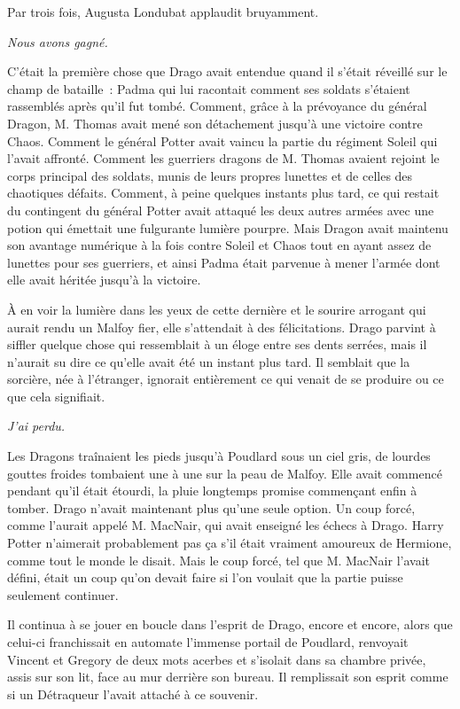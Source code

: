 Par trois fois, Augusta Londubat applaudit bruyamment.

\later

\emph{Nous avons gagné.}

C'était la première chose que Drago avait entendue quand il s'était réveillé sur le champ de bataille~: Padma qui lui racontait comment ses soldats s'étaient rassemblés après qu'il fut tombé.
Comment, grâce à la prévoyance du général Dragon, M. Thomas avait mené son détachement jusqu'à une victoire contre Chaos.
Comment le général Potter avait vaincu la partie du régiment Soleil qui l'avait affronté.
Comment les guerriers dragons de M. Thomas avaient rejoint le corps principal des soldats, munis de leurs propres lunettes et de celles des chaotiques défaits.
Comment, à peine quelques instants plus tard, ce qui restait du contingent du général Potter avait attaqué les deux autres armées avec une potion qui émettait une fulgurante lumière pourpre.
Mais Dragon avait maintenu son avantage numérique à la fois contre Soleil et Chaos tout en ayant assez de lunettes pour ses guerriers, et ainsi Padma était parvenue à mener l'armée dont elle avait héritée jusqu'à la victoire.

À en voir la lumière dans les yeux de cette dernière et le sourire arrogant qui aurait rendu un Malfoy fier, elle s'attendait à des félicitations.
Drago parvint à siffler quelque chose qui ressemblait à un éloge entre ses dents serrées, mais il n'aurait su dire ce qu'elle avait été un instant plus tard.
Il semblait que la sorcière, née à l'étranger, ignorait entièrement ce qui venait de se produire ou ce que cela signifiait.

\emph{J'ai perdu.}

Les Dragons traînaient les pieds jusqu'à Poudlard sous un ciel gris, de lourdes gouttes froides tombaient une à une sur la peau de Malfoy.
Elle avait commencé pendant qu'il était étourdi, la pluie longtemps promise commençant enfin à tomber.
Drago n'avait maintenant plus qu'une seule option.
Un coup forcé, comme l'aurait appelé M. MacNair, qui avait enseigné les échecs à Drago.
Harry Potter n'aimerait probablement pas ça s'il était vraiment amoureux de Hermione, comme tout le monde le disait.
Mais le coup forcé, tel que M. MacNair l'avait défini, était un coup qu'on devait faire si l'on voulait que la partie puisse seulement continuer.

Il continua à se jouer en boucle dans l'esprit de Drago, encore et encore, alors que celui-ci franchissait en automate l'immense portail de Poudlard, renvoyait Vincent et Gregory de deux mots acerbes et s'isolait dans sa chambre privée, assis sur son lit, face au mur derrière son bureau.
Il remplissait son esprit comme si un Détraqueur l'avait attaché à ce souvenir.

